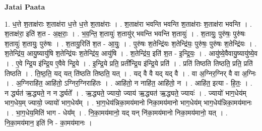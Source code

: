 \documentclass[17pt]{extarticle}
\begin{document}
\textbf{Jatai Paata} \newline

1. ध॒त्ते श॒ताक्ष॑राः श॒ताक्ष॑रा ध॒त्ते ध॒त्ते श॒ताक्ष॑राः । . श॒ताक्ष॑रा भवन्ति भवन्ति श॒ताक्ष॑राः श॒ताक्ष॑रा भवन्ति । . श॒ताक्ष॑रा॒ इति॑ श॒त - अ॒क्ष॒राः॒ । . भ॒व॒न्ति॒ श॒तायुः॑ श॒तायु॑र् भवन्ति भवन्ति श॒तायुः॑ । . श॒तायुः॒ पुरु॑षः॒ पुरु॑षः श॒तायुः॑ श॒तायुः॒ पुरु॑षः । . श॒तायु॒रिति॑ श॒त - आ॒युः॒ । . पुरु॑षः श॒तेन्द्रि॑यः श॒तेन्द्रि॑यः॒ पुरु॑षः॒ पुरु॑षः श॒तेन्द्रि॑यः । . श॒तेन्द्रि॑य॒ आयु॒ष्यायु॑षि श॒तेन्द्रि॑यः श॒तेन्द्रि॑य॒ आयु॑षि । . श॒तेन्द्रि॑य॒ इति॑ श॒त - इ॒न्द्रि॒यः॒ । . आयु॑ष्ये॒वैवायु॒ष्यायु॑ष्ये॒व । . ए॒वे न्द्रि॒य इ॑न्द्रि॒य ए॒वैवे न्द्रि॒ये । . इ॒न्द्रि॒ये प्रति॒ प्रती᳚न्द्रि॒य इ॑न्द्रि॒ये प्रति॑ । . प्रति॑ तिष्ठति तिष्ठति॒ प्रति॒ प्रति॑ तिष्ठति । . ति॒ष्ठ॒ति॒ यद् यत् ति॑ष्ठति तिष्ठति॒ यत् । . यद् वै वै यद् यद् वै । . वा अ॒ग्निर॒ग्निर् वै वा अ॒ग्निः । . अ॒ग्निराहि॑त॒ आहि॑तो॒ ऽग्निर॒ग्निराहि॑तः । . आहि॑तो॒ न नाहि॑त॒ आहि॑तो॒ न । . आहि॑त॒ इत्या - हि॒तः॒ । . न र्द्ध्यत॑ ऋ॒द्ध्यते॒ न न र्द्ध्यते᳚ । . ऋ॒द्ध्यते॒ ज्यायो॒ ज्याय॑ ऋ॒द्ध्यत॑ ऋ॒द्ध्यते॒ ज्यायः॑ । . ज्यायो॑ भाग॒धेय॑म् भाग॒धेय॒म् ज्यायो॒ ज्यायो॑ भाग॒धेय᳚म् । . भा॒ग॒धेय॑न्निका॒मय॑मानो निका॒मय॑मानो भाग॒धेय॑म् भाग॒धेय॑न्निका॒मय॑मानः । . भा॒ग॒धेय॒मिति॑ भाग - धेय᳚म् । . नि॒का॒मय॑मानो॒ यद् यन् नि॑का॒मय॑मानो निका॒मय॑मानो॒ यत् । . नि॒का॒मय॑मान॒ इति॑ नि - का॒मय॑मानः । \newline
\end{document}
